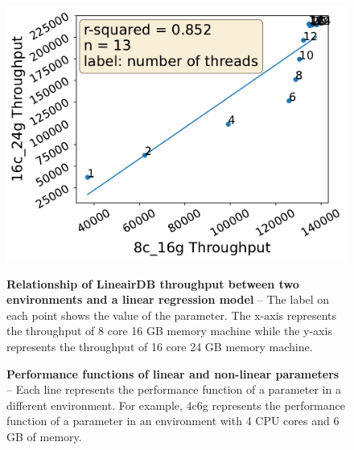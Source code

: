 \begin{figure}[htbp]
  \centering
  \begin{minipage}{.4\textwidth}
    \centering
    \includegraphics[width=.7\linewidth]{src/fig/rw8_vs_16.pdf}
    \caption{\textbf{Relationship of LineairDB\cite{lineairdb} throughput between two environments and a linear regression model} -- The label on each point shows the value of the parameter. The x-axis represents the throughput of 8 core 16 GB memory machine while the y-axis represents the throughput of 16 core 24 GB memory machine.}
    \label{fig:valov}
  \end{minipage}%
  \hfill
  \begin{minipage}{.55\textwidth}
    \centering
    \hfill
    \caption{\textbf{Performance functions of linear and non-linear parameters} -- Each line represents the performance function of a parameter in a different environment. For example, 4c6g represents the performance function of a parameter in an environment with 4 CPU cores and 6 GB of memory.}
    \label{fig:params}
  \end{minipage}
\end{figure}


